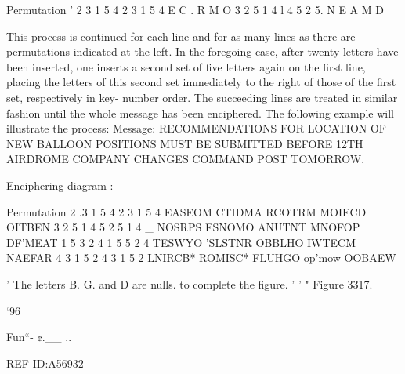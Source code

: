 { 

 

 

 

Permutation
' 2 3 1 5 4
2 3 1 5 4 E C . R M O
3 2 5 1 4
l 4
5 2 5. N E A M D

 

 

 

 

 

 

 

This process is continued for each line and for as many lines as there
are permutations indicated at the left. In the foregoing case, after
twenty letters have been inserted, one inserts a second set of ﬁve
letters again on the ﬁrst line, placing the letters of this second set
immediately to the right of those of the ﬁrst set, respectively in key-
number order. The succeeding lines are treated in similar fashion
until the whole message has been enciphered. The following example
will illustrate the process:
Message: RECOMMENDATIONS FOR LOCATION OF NEW
BALLOON POSITIONS MUST BE SUBMITTED
BEFORE 12TH AIRDROME COMPANY CHANGES
COMMAND POST TOMORROW.

Enciphering diagram :

 

 

 

 

 

 

 

 

Permutation
2 .3 1 5 4 2 3 1 5 4
EASEOM CTIDMA RCOTRM MOIECD OITBEN
3 2 5 1 4 5 2 5 1 4
_ NOSRPS ESNOMO ANUTNT MNOFOP DF'MEAT
1 5 3 2 4 1 5 5 2 4
TESWYO 'SLSTNR OBBLHO IWTECM NAEFAR
4 3 1 5 2 4 3 1 5 2
LNIRCB* ROMISC* FLUHGO op'mow OOBAEW

 

 

 

 

 

 

 

' The letters B. G. and D are nulls. to complete the ﬁgure.
' ' " Figure 3317.

‘96

 

Fun“- ¢.__ ..

 

REF ID:A56932

}
